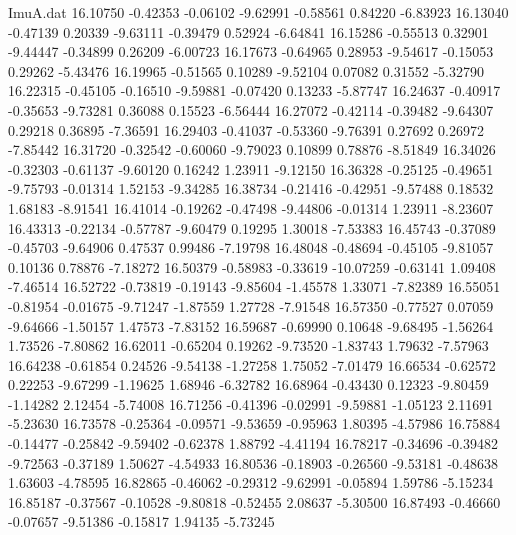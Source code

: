 \begin{filecontents}{ImuA.dat}
  16.10750   -0.42353   -0.06102   -9.62991   -0.58561    0.84220   -6.83923
  16.13040   -0.47139    0.20339   -9.63111   -0.39479    0.52924   -6.64841
  16.15286   -0.55513    0.32901   -9.44447   -0.34899    0.26209   -6.00723
  16.17673   -0.64965    0.28953   -9.54617   -0.15053    0.29262   -5.43476
  16.19965   -0.51565    0.10289   -9.52104    0.07082    0.31552   -5.32790
  16.22315   -0.45105   -0.16510   -9.59881   -0.07420    0.13233   -5.87747
  16.24637   -0.40917   -0.35653   -9.73281    0.36088    0.15523   -6.56444
  16.27072   -0.42114   -0.39482   -9.64307    0.29218    0.36895   -7.36591
  16.29403   -0.41037   -0.53360   -9.76391    0.27692    0.26972   -7.85442
  16.31720   -0.32542   -0.60060   -9.79023    0.10899    0.78876   -8.51849
  16.34026   -0.32303   -0.61137   -9.60120    0.16242    1.23911   -9.12150
  16.36328   -0.25125   -0.49651   -9.75793   -0.01314    1.52153   -9.34285
  16.38734   -0.21416   -0.42951   -9.57488    0.18532    1.68183   -8.91541
  16.41014   -0.19262   -0.47498   -9.44806   -0.01314    1.23911   -8.23607
  16.43313   -0.22134   -0.57787   -9.60479    0.19295    1.30018   -7.53383
  16.45743   -0.37089   -0.45703   -9.64906    0.47537    0.99486   -7.19798
  16.48048   -0.48694   -0.45105   -9.81057    0.10136    0.78876   -7.18272
  16.50379   -0.58983   -0.33619  -10.07259   -0.63141    1.09408   -7.46514
  16.52722   -0.73819   -0.19143   -9.85604   -1.45578    1.33071   -7.82389
  16.55051   -0.81954   -0.01675   -9.71247   -1.87559    1.27728   -7.91548
  16.57350   -0.77527    0.07059   -9.64666   -1.50157    1.47573   -7.83152
  16.59687   -0.69990    0.10648   -9.68495   -1.56264    1.73526   -7.80862
  16.62011   -0.65204    0.19262   -9.73520   -1.83743    1.79632   -7.57963
  16.64238   -0.61854    0.24526   -9.54138   -1.27258    1.75052   -7.01479
  16.66534   -0.62572    0.22253   -9.67299   -1.19625    1.68946   -6.32782
  16.68964   -0.43430    0.12323   -9.80459   -1.14282    2.12454   -5.74008
  16.71256   -0.41396   -0.02991   -9.59881   -1.05123    2.11691   -5.23630
  16.73578   -0.25364   -0.09571   -9.53659   -0.95963    1.80395   -4.57986
  16.75884   -0.14477   -0.25842   -9.59402   -0.62378    1.88792   -4.41194
  16.78217   -0.34696   -0.39482   -9.72563   -0.37189    1.50627   -4.54933
  16.80536   -0.18903   -0.26560   -9.53181   -0.48638    1.63603   -4.78595
  16.82865   -0.46062   -0.29312   -9.62991   -0.05894    1.59786   -5.15234
  16.85187   -0.37567   -0.10528   -9.80818   -0.52455    2.08637   -5.30500
  16.87493   -0.46660   -0.07657   -9.51386   -0.15817    1.94135   -5.73245

\end{filecontents}
